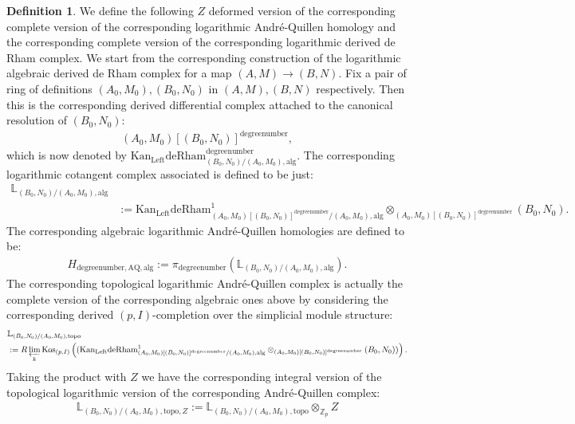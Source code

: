 \documentclass[11pt]{book}
\theoremstyle{definition}
\newtheorem{definition}[theorem]{Definition}
\numberwithin{equation}{section}
\begin{document}
\begin{definition}
We define the following $Z$ deformed version of the corresponding complete version of the corresponding logarithmic Andr\'e-Quillen homology and the corresponding complete version of the corresponding logarithmic derived de Rham complex. We start from the corresponding construction of the logarithmic algebraic derived de Rham complex for a map $(A,M)\rightarrow (B,N)$. Fix a pair of ring of definitions $(A_0,M_0),(B_0,N_0)$ in $(A,M),(B,N)$ respectively. Then this is the corresponding derived differential complex attached to the canonical resolution of $(B_0,N_0)$:
\begin{align}
(A_0,M_0)[(B_0,N_0)]^\text{degreenumber},	
\end{align}
which is now denoted by $\mathrm{Kan}_\mathrm{Left}\mathrm{deRham}^\text{degreenumber}_{(B_0,N_0)/(A_0,M_0),\mathrm{alg}}$. The corresponding logarithmic cotangent complex associated is defined to be just:
\begin{align}
\mathbb{L}_{(B_0,N_0)/(A_0,M_0),\mathrm{alg}}\\
&:=	\mathrm{Kan}_\mathrm{Left}\mathrm{deRham}^1_{(A_0,M_0)[(B_0,N_0)]^\text{degreenumber}/(A_0,M_0),\mathrm{alg}}\otimes_{(A_0,M_0)[(B_0,N_0)]^\text{degreenumber}} (B_0,N_0).
\end{align}
The corresponding algebraic logarithmic Andr\'e-Quillen homologies are defined to be:
\begin{align}
H_{\text{degreenumber},{\mathrm{AQ}},\mathrm{alg}}:=\pi_\text{degreenumber} (\mathbb{L}_{(B_0,N_0)/(A_0,M_0),\mathrm{alg}}). 	
\end{align}
The corresponding topological logarithmic Andr\'e-Quillen complex is actually the complete version of the corresponding algebraic ones above by considering the corresponding derived $(p,I)$-completion over the simplicial module structure:
\begin{align}
&\mathbb{L}_{(B_0,N_0)/(A_0,M_0),\mathrm{topo}}\\
&:=R\varprojlim_k\mathrm{Kos}_{(p,I)}	\left((\mathrm{Kan}_\mathrm{Left}\mathrm{deRham}^1_{(A_0,M_0)[(B_0,N_0)]^\text{degreenumber}/(A_0,M_0),\mathrm{alg}}\otimes_{(A_0,M_0)[(B_0,N_0)]^\text{degreenumber}} (B_0,N_0))\right).
\end{align}
Taking the product with $Z$ we have the corresponding integral version of the topological logarithmic version of the corresponding Andr\'e-Quillen complex:
\begin{align}
\mathbb{L}_{(B_0,N_0)/(A_0,M_0),\mathrm{topo},Z}:=\mathbb{L}_{(B_0,N_0)/(A_0,M_0),\mathrm{topo}}{\otimes}_{\mathbb{Z}_p}Z

\end{align}
\end{definition}
\end{document}

